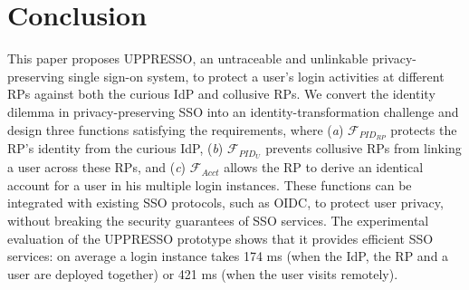 \section{Conclusion}
\label{sec:conclusion}
This paper proposes UPPRESSO, an untraceable and unlinkable privacy-preserving single sign-on system,
 to protect a user's login activities at different RPs against both the curious IdP and collusive RPs.
We convert the identity dilemma in privacy-preserving SSO into an identity-transformation challenge
 and design three functions satisfying the requirements,
 where (\emph{a}) $\mathcal{F}_{PID_{RP}}$ protects the RP's identity from the curious IdP,
(\emph{b})  $\mathcal{F}_{PID_{U}}$ prevents collusive RPs from linking a user across these RPs,
 and (\emph{c}) $\mathcal{F}_{Acct}$ allows the RP to derive an identical account for a user in his multiple login instances.
These functions can be integrated with existing SSO protocols,
    such as OIDC,
    to protect user privacy,
    without breaking the security guarantees of SSO services.
The experimental evaluation of the UPPRESSO prototype shows
 that it provides efficient SSO services:
  on average a login instance takes 174 ms (when the IdP, the RP and a user are deployed together) or 421 ms (when the user visits remotely).
